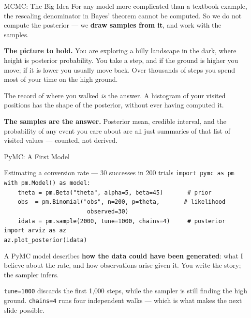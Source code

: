 \documentclass[aspectratio=169, 11pt]{beamer}
\begin{document}
\begin{frame}{MCMC: The Big Idea}
  For any model more complicated than a textbook example, the rescaling denominator in Bayes'
  theorem cannot be computed. So we do not compute the posterior --- we \textbf{draw samples
  from it}, and work with the samples.

  \vspace{0.15cm}
  \textbf{The picture to hold.} You are exploring a hilly landscape in the dark, where height is
  posterior probability. You take a step, and if the ground is higher you move; if it is lower
  you usually move back. Over thousands of steps you spend most of your time on the high ground.

  \vspace{0.15cm}
  The record of where you walked \emph{is} the answer. A histogram of your visited positions has
  the shape of the posterior, without ever having computed it.

  \begin{keybox}
    \textbf{The samples are the answer.} Posterior mean, credible interval, and the probability
    of any event you care about are all just summaries of that list of visited values ---
    counted, not derived.
  \end{keybox}

\end{frame}

\begin{frame}{PyMC: A First Model}
  \begin{examplebox}{Estimating a conversion rate --- 30 successes in 200 trials}
    {\tiny\linespread{1.2}\selectfont
    \texttt{import pymc as pm}\\[2pt]
    \texttt{with pm.Model() as model:}\\
    \texttt{\ \ \ \ theta = pm.Beta("theta", alpha=5, beta=45)\ \ \ \ \ \ \ \# prior}\\
    \texttt{\ \ \ \ obs\ \ = pm.Binomial("obs", n=200, p=theta,\ \ \ \ \ \ \ \# likelihood}\\
    \texttt{\ \ \ \ \ \ \ \ \ \ \ \ \ \ \ \ \ \ \ \ \ \ \ \ observed=30)}\\
    \texttt{\ \ \ \ idata = pm.sample(2000, tune=1000, chains=4)\ \ \ \ \ \# posterior}\\[3pt]
    \texttt{import arviz as az}\\
    \texttt{az.plot\_posterior(idata)}
    }
  \end{examplebox}
  A PyMC model describes \textbf{how the data could have been generated}: what I believe about
  the rate, and how observations arise given it. You write the story; the sampler infers.

  \texttt{tune=1000} discards the first 1{,}000 steps, while the sampler is still finding the
  high ground. \texttt{chains=4} runs four independent walks --- which is what makes the next
  slide possible.
\end{frame}
\end{document}
